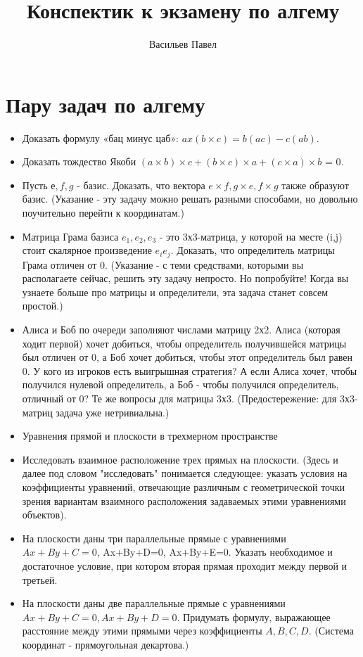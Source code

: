 \documentclass[a4paper]{article}
\title{Конспектик к экзамену по алгему}
\author{Васильев Павел}
\begin{document}
\section*{Пару задач по алгему}

\begin{itemize}


\item Доказать формулу «бац минус цаб»: $a x (b \times c) = b(ac) - c(ab)$.
\item Доказать тождество Якоби $(a \times b) \times c + (b \times c) \times a + (c \times a) \times b$ = 0.
\item Пусть $е, f,g$  - базис. Доказать, что вектора $e \times f, g \times e, f \times g$ также образуют базис. (Указание - эту задачу можно решать разными способами, но довольно поучительно перейти к координатам.)
\item Матрица Грама базиса $e_1,e_2,e_3$ - это 3х3-матрица, у которой на месте (i,j) стоит скалярное произведение $e_ie_j$. Доказать, что определитель матрицы Грама отличен от 0. (Указание - с теми средствами, которыми вы располагаете сейчас, решить эту задачу непросто. Но попробуйте! Когда вы узнаете больше про матрицы и определители, эта задача станет совсем простой.)
\item Алиса и Боб по очереди заполняют числами матрицу 2х2. Алиса (которая ходит первой) хочет добиться, чтобы определитель получившейся матрицы был отличен от 0, а Боб хочет добиться, чтобы этот определитель был равен 0. У кого из игроков есть выигрышная стратегия? А если Алиса хочет, чтобы получился нулевой определитель, а Боб - чтобы получился определитель, отличный от 0? Те же вопросы для матрицы 3х3. (Предостережение: для 3х3-матриц задача уже нетривиальна.)
\item Уравнения прямой и плоскости в трехмерном пространстве
\item Исследовать взаимное расположение трех прямых на плоскости. (Здесь и далее под словом "исследовать" понимается следующее: указать условия на коэффициенты уравнений, отвечающие различным с геометрической точки зрения вариантам взаимного расположения задаваемых этими уравнениями объектов).
\item На плоскости даны три параллельные прямые с уравнениями $Ax+By+C=0$, Ax+By+D=0, Ax+By+E=0. Указать необходимое и достаточное условие, при котором вторая прямая проходит между первой и третьей.
\item На плоскости даны две параллельные прямые с уравнениями $Ax+By+C=0, Ax+By+D=0$. Придумать формулу, выражающее расстояние между этими прямыми через коэффициенты $A,B,C,D$. (Система координат - прямоугольная декартова.)

\end{itemize}
\end{document}

